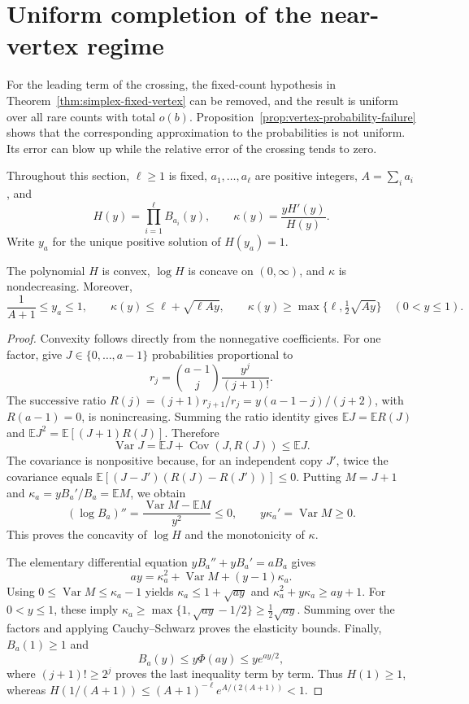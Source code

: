 \section{Uniform completion of the near-vertex regime}
\label{sec:vertex-completion}

For the leading term of the crossing, the fixed-count hypothesis in
Theorem~\ref{thm:simplex-fixed-vertex} can be removed, and the result is
uniform over all rare counts with total $o(b)$.
Proposition~\ref{prop:vertex-probability-failure} shows that the
corresponding approximation to the probabilities is not uniform. Its
error can blow up while the relative error of the crossing tends to zero.

Throughout this section, $\ell\ge1$ is fixed, $a_1,\ldots,a_\ell$
are positive integers, $A=\sum_i a_i$, and
\[
 H(y)=\prod_{i=1}^{\ell}B_{a_i}(y),\qquad
 \kappa(y)=\frac{yH'(y)}{H(y)}.
\]
Write $y_a$ for the unique positive solution of $H(y_a)=1$.

\begin{lemma}
\label{lem:vertex-elasticity}
The polynomial $H$ is convex, $\log H$ is concave on $(0,\infty)$,
and $\kappa$ is nondecreasing. Moreover,
\begin{equation}\label{eq:vertex-elasticity}
 \frac1{A+1}\le y_a\le1,\qquad
 \kappa(y)\le \ell+\sqrt{\ell Ay},
 \qquad \kappa(y)\ge \max\{\ell,\tfrac12\sqrt{Ay}\}
 \quad(0<y\le1).
\end{equation}
\end{lemma}

\begin{proof}
Convexity follows directly from the nonnegative coefficients. For one
factor, give $J\in\{0,\ldots,a-1\}$ probabilities proportional to
\[
 r_j=\binom{a-1}{j}\frac{y^j}{(j+1)!}.
\]
The successive ratio
$R(j)=(j+1)r_{j+1}/r_j=y(a-1-j)/(j+2)$, with $R(a-1)=0$,
is nonincreasing. Summing the ratio identity gives
$\mathbb E J=\mathbb E R(J)$ and
$\mathbb E J^2=\mathbb E[(J+1)R(J)]$. Therefore
\[
 \operatorname{Var}J=\mathbb E J+\operatorname{Cov}(J,R(J))
 \le \mathbb E J.
\]
The covariance is nonpositive because, for an independent copy $J'$,
twice the covariance equals
$\mathbb E[(J-J')(R(J)-R(J'))]\le0$.
Putting $M=J+1$ and $\kappa_a=yB_a'/B_a=\mathbb E M$, we obtain
\[
 (\log B_a)''=\frac{\operatorname{Var}M-\mathbb E M}{y^2}\le0,
 \qquad y\kappa_a'=\operatorname{Var}M\ge0.
\]
This proves the concavity of $\log H$ and the monotonicity of $\kappa$.

The elementary differential equation $yB_a''+yB_a'=aB_a$ gives
\[
 ay=\kappa_a^2+\operatorname{Var}M+(y-1)\kappa_a.
\]
Using $0\le\operatorname{Var}M\le\kappa_a-1$ yields
$\kappa_a\le1+\sqrt{ay}$ and
$\kappa_a^2+y\kappa_a\ge ay+1$.
For $0<y\le1$, these imply
$\kappa_a\ge\max\{1,\sqrt{ay}-1/2\}
\ge\tfrac12\sqrt{ay}$.
Summing over the factors and applying Cauchy--Schwarz proves the
elasticity bounds. Finally, $B_a(1)\ge1$ and
\[
 B_a(y)\le y\Phi(ay)\le y e^{ay/2},
\]
where $(j+1)!\ge2^j$ proves the last inequality term by term.
Thus $H(1)\ge1$, whereas
$H(1/(A+1))\le(A+1)^{-\ell}e^{A/(2(A+1))}<1$.
\end{proof}

